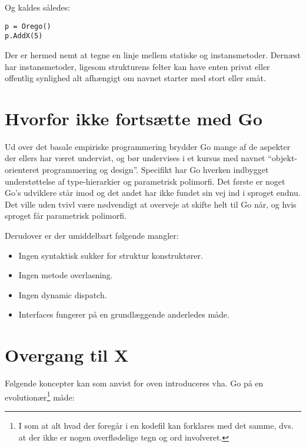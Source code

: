 Og kaldes således:

\begin{lstlisting}
p = Orego()
p.AddX(5)
\end{lstlisting}

Der er hermed nemt at tegne en linje mellem statiske og instansmetoder. Dernæst
har instansmetoder, ligesom strukturens felter kan have enten privat eller
offentlig synlighed alt afhængigt om navnet starter med stort eller småt.

\section{Hvorfor ikke fortsætte med Go}

Ud over det basale empiriske programmering brydder Go mange af de aspekter der
ellers har været undervist, og bør undervises i et kursus med navnet
``objekt-orienteret programmering og design''. Specifikt har Go hverken
indbygget understøttelse af type-hierarkier og parametrisk polimorfi. Det
første er noget Go's udviklere står imod og det andet har ikke fundet sin vej
ind i sproget endnu\cite{go-faq}. Det ville uden tvivl være nødvendigt at
overveje at skifte helt til Go når, og hvis sproget får parametrisk polimorfi.

Derudover er der umiddelbart følgende mangler:

\begin{itemize}

\item Ingen syntaktisk sukker for struktur konstruktører.

\item Ingen metode overlasning.

\item Ingen dynamic dispatch.

\item Interfaces fungerer på en grundlæggende anderledes måde.

\end{itemize}

\section{Overgang til X} 

Følgende koncepter kan som anvist for oven introduceres vha. Go på en
evolutionær\footnote{I som at alt hvad der foregår i en kodefil kan forklares
med det samme, dvs. at der ikke er nogen overflødelige tegn og ord involveret.}
måde:

